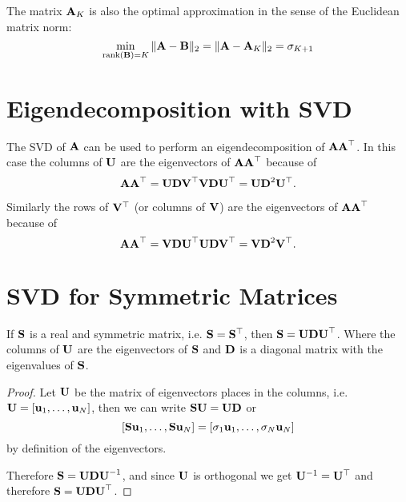 The matrix \(\mathbf{A}_K\) is also the optimal approximation in the sense of the Euclidean matrix norm:
\[
\min_{\operatorname{rank}(\mathbf{B}) = K} \|\mathbf{A} - \mathbf{B}\|_2 = \|\mathbf{A} - \mathbf{A}_K\|_2 = \sigma_{K + 1}
\]

\section{Eigendecomposition with SVD}
The SVD of \(\mathbf{A}\) can be used to perform an eigendecomposition of \(\mathbf{AA}^\top\). In this case the columns of \(\mathbf{U}\) are the eigenvectors of \(\mathbf{AA}^\top\) because of 
\[
\mathbf{AA}^\top = \mathbf{UDV}^\top \mathbf{VDU}^\top = \mathbf{UD}^2\mathbf{U}^\top.
\]

Similarly the rows of \(\mathbf{V}^\top\) (or columns of \(\mathbf{V}\)) are the eigenvectors of \(\mathbf{AA}^\top\) because of
\[
\mathbf{AA}^\top = \mathbf{VDU}^\top \mathbf{UDV}^\top = \mathbf{VD}^2\mathbf{V}^\top.
\]


\section{SVD for Symmetric Matrices}
\begin{theorem}
If \(\mathbf{S}\) is a real and symmetric matrix, i.e. \(\mathbf{S} = \mathbf{S}^\top\), then \(\mathbf{S} = \mathbf{UDU}^\top\). Where the columns of \(\mathbf{U}\) are the eigenvectors of \(\mathbf{S}\) and \(\mathbf{D}\) is a diagonal matrix with the eigenvalues of \(\mathbf{S}\).
\end{theorem}

\begin{proof}
Let \(\mathbf{U}\) be the matrix of eigenvectors places in the columns, i.e. \(\mathbf{U} = [\mathbf{u}_1, \ldots, \mathbf{u}_N]\), then we can write \(\mathbf{SU} = \mathbf{UD}\) or \[
[\mathbf{Su}_1, \ldots, \mathbf{Su}_N] = [\sigma_1 \mathbf{u}_1, \ldots, \sigma_N \mathbf{u}_N]
\]
by definition of the eigenvectors.

Therefore \(\mathbf{S} = \mathbf{UDU}^{-1}\), and since \(\mathbf{U}\) is orthogonal we get \(\mathbf{U}^{-1} = \mathbf{U}^\top\) and therefore \(\mathbf{S} = \mathbf{UDU}^\top\).
\end{proof}

